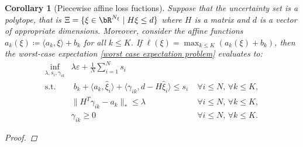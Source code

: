 \documentclass[11pt,a4paper,oneside,openany]{book}
\newtheorem{corollary}{Corollary}[theorem]
\numberwithin{definition}{section}
\numberwithin{theorem}{section}
\numberwithin{problem}{section}
\begin{document}
\begin{corollary}[Piecewise affine loss fuctions]
\label{affine cost finite reduction}
Suppose that the uncertainty set is a polytope, that is $\Xi = \{\xi \in \bR^{N_{\xi}} \mid H\xi \leq d\}$ where $H$ is a matrix and $d$ is a vector of appropriate dimensions. Moreover, consider the affine functions $a_k(\xi)\coloneqq \langle a_k, \xi\rangle + b_k$ for all $k \leq K$.
 If $\ell(\xi) = \max_{k \leq K}(a_k(\xi) + b_k)$, then the worst-case expectation \eqref{worst case expectation problem} evaluates to:
    \begin{align} \label{affinecostfiniteredequation}
        \inf_{\lambda,s_i,\gamma_{ik}} & \lambda\varepsilon + \frac{1} {N}\sum_{i=1}^N s_i & \\
        \text{s.t.} &\; b_k + \langle a_k, \hat \xi_i\rangle + \langle \gamma_{ik}, d-H\hat \xi_i \rangle \leq s_i \;& \forall i \leq N, \, \forall k \leq K, \\
        & \|H^T\gamma_{ik}-a_k\|_* \leq \lambda  \;& \forall i \leq N, \, \forall k \leq K, \\
        &\gamma_{ik} \geq 0  \;& \forall i \leq N, \, \forall k \leq K .
    \end{align}
\begin{proof}
    

\end{proof}
\end{corollary}
\end{document}
